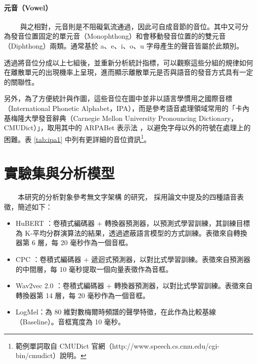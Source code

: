 \paragraph{元音（Vowel）} \hfill \break
　　
        與之相對，元音則是不阻礙氣流通過，因此可自成音節的音位。其中又可分為發音位置固定的單元音（Monophthong）和會移動發音位置的的雙元音（Diphthong）兩類。通常基於 a、e、i、o、u 字母產生的聲音皆屬於此類別。
        
        透過將音位分成以上七組後，並重新分析統計指標，可以觀察這些分組的規律如何在離散單元的出現機率上呈現，進而顯示離散單元是否與語音的發音方式具有一定的關聯性。

        另外，為了方便統計與作圖，這些音位在圖中並非以語言學慣用之國際音標（International Phonetic Alphabet，IPA）\cite{international1999handbook}，而是參考語音處理領域常用的「卡內基梅隆大學發音辭典（Carnegie Mellon University Pronouncing Dictionary，CMUDict）\cite{noauthor_cmu_nodate}」，取用其中的 ARPABet 表示法 \cite{klautau2001arpabet}，以避免字母以外的符號在處理上的困難。表 \ref{tab:ipa1} 中列有更詳細的音位資訊\footnote{範例單詞取自 CMUDict 官網（http://www.speech.cs.cmu.edu/cgi-bin/cmudict）說明。}。



\section{實驗集與分析模型}  %

　　本研究的分析對象參考無文字架構 \cite{noauthor_textless_2021, lakhotia_generative_2021, lakhotia_generative_2021-1} 的研究，
採用論文中提及的四種語音表徵，簡述如下：

\begin{itemize}
    \item HuBERT \cite{hsu_hubert_2021-2}：卷積式編碼器 + 轉換器預測器，以預測式學習訓練，其訓練目標為 K-平均分群演算法的結果，透過遮蔽語言模型的方式訓練。表徵來自轉換器第 6 層，每 20 毫秒作為一個音框。
    \item CPC \cite{rivière2020unsupervised}：卷積式編碼器 + 遞迴式預測器，以對比式學習訓練。表徵來自預測器的中間層，每 10 毫秒提取一個向量表徵作為音框。
    \item Wav2vec 2.0 \cite{baevski2020wav2vec}：卷積式編碼器 + 轉換器預測器，以對比式學習訓練。表徵來自轉換器第 14 層，每 20 毫秒作為一個音框。
    \item LogMel：為 80 維對數梅爾時頻譜的聲學特徵，在此作為比較基線（Baseline）。音框寬度為 10 毫秒。
\end{itemize}

